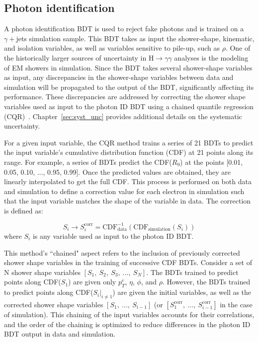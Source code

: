 \subsection{Photon identification}

A photon identification BDT is used to reject fake photons and is trained on a $\gamma+$jets simulation sample. This BDT takes as input the shower-shape, kinematic, and isolation variables, as well as variables sensitive to pile-up, such as $\rho$. One of the historically larger sources of uncertainty in H$\rightarrow\gamma\gamma$ analyses is the modeling of EM showers in simulation. Since the BDT takes several shower-shape variables as input, any discrepancies in the shower-shape variables between data and simulation will be propagated to the output of the BDT, significantly affecting its performance. These discrepancies are addressed by correcting the shower shape variables used as input to the photon ID BDT using a chained quantile regression (CQR)~\cite{cqr}. Chapter~\ref{sec:syst_unc} provides additional details on the systematic uncertainty.

For a given input variable, the CQR method trains a series of 21 BDTs to predict the input variable's cumulative distribution function (CDF) at 21 points along its range. For example, a series of BDTs predict the CDF($R_9$) at the points [0.01, 0.05, 0.10, ..., 0.95, 0.99]. Once the predicted values are obtained, they are linearly interpolated to get the full CDF. This process is performed on both data and simulation to define a correction value for each electron in simulation such that the input variable matches the shape of the variable in data. The correction is defined as:

\begin{equation}
    S_i \rightarrow S_i^{\mathrm{corr}} = \mathrm{CDF}^{-1}_{\mathrm{data}}( \mathrm{CDF_{simulation}}(S_i))
\end{equation}
where $S_i$ is any variable used as input to the photon ID BDT. 

This method's ``chained" aspect refers to the inclusion of previously corrected shower shape variables in the training of successive CDF BDTs. Consider a set of N shower shape variables $[S_1,\ S_2,\ S_3,\ ...,\ S_N]$. The BDTs trained to predict points along CDF($S_1$) are given only $p_T^{e}$, $\eta$, $\phi$, and $\rho$. However, the BDTs trained to predict points along CDF($S_i|_{i\neq 1}$) are given the initial variables, as well as the corrected shower shape variables $[S_1,\ ...,\ S_{i-1}]$ (or $[S_1^{\mathrm{corr}},\ ...,\ S_{i-1}^{\mathrm{corr}}]$ in the case of simulation). This chaining of the input variables accounts for their correlations, and the order of the chaining is optimized to reduce differences in the photon ID BDT output in data and simulation. 

